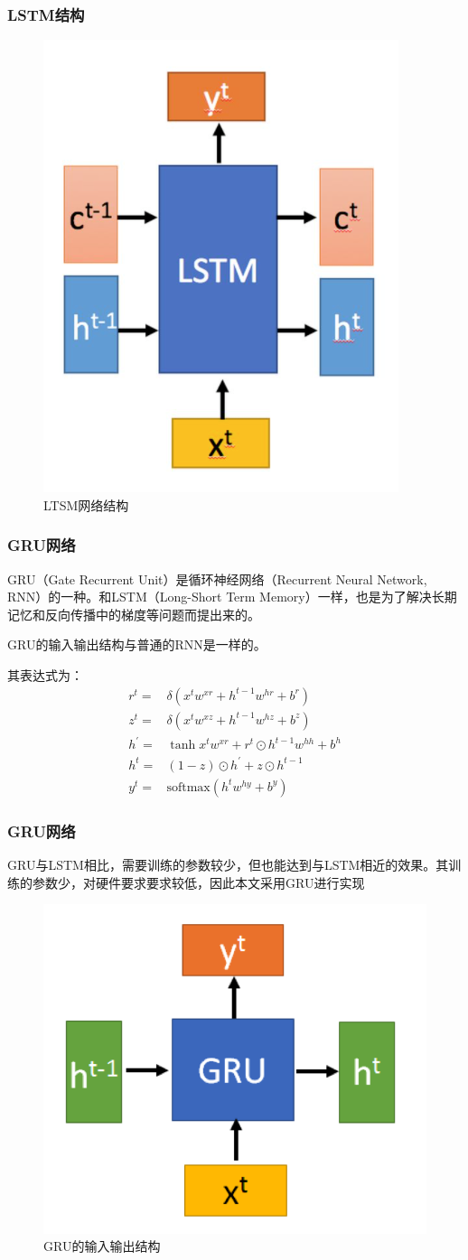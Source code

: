 \documentclass[aspectratio=169, 10pt, utf8, mathserif]{beamer}
\begin{document}
\begin{frame}
	\frametitle{LSTM结构}
	\begin{figure}[H]
		\centering
		\includegraphics[width=0.3\linewidth]{pic/screenshot002}
		\caption{LTSM网络结构}
		\label{fig:screenshot002}
	\end{figure}
\end{frame}	
\begin{frame}
	\frametitle{GRU网络}
	GRU（Gate Recurrent Unit）是循环神经网络（Recurrent Neural Network, RNN）的一种。和LSTM（Long-Short Term Memory）一样，也是为了解决长期记忆和反向传播中的梯度等问题而提出来的。
	
	GRU的输入输出结构与普通的RNN是一样的。
	
	其表达式为：
	\begin{align}
		r^{t}=&\delta(x^{t}w^{xr}+h^{t-1}w^{hr}+b^{r})\\
		z^{t}=&\delta(x^{t}w^{xz}+h^{t-1}w^{hz}+b^{z})\\
		h^{\prime}=&\tanh{x^{t}w^{xr}+r^{t}\odot h^{t-1}w^{hh}+b^{h} }\\
		h^t=&(1-z)\odot h^{\prime}+z\odot h^{t-1}\\
		y^{t}=&\text{softmax}(h^{t}w^{hy}+b^{y})
	\end{align}
\end{frame}	
\begin{frame}
	\frametitle{GRU网络}
	GRU与LSTM相比，需要训练的参数较少，但也能达到与LSTM相近的效果。其训练的参数少，对硬件要求要求较低，因此本文采用GRU进行实现
	\begin{figure}[H]
		\centering
		\includegraphics[width=0.3\linewidth]{pic/screenshot003}
		\caption{GRU的输入输出结构}
		\label{fig:screenshot003}
	\end{figure}
\end{frame}	
\end{document}
